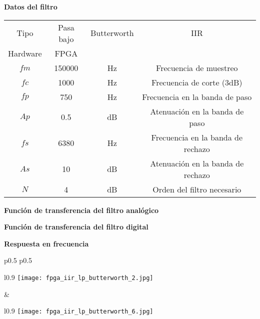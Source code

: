 \documentclass[informe.tex]{subfiles}
\begin{document}
\textbf{Datos del filtro}	\newline	
								
	\begin{tabular}{ |c | c| c| c|}
		\hline
 			 Tipo     & Pasa bajo & Butterworth &  IIR \\
 			 Hardware & FPGA &  & \\
			$ fm $  & 150000  & Hz & Frecuencia de muestreo \\
			$ fc $  & 1000  & Hz & Frecuencia de corte (3dB) \\
			$ fp $  & 750  & Hz & Frecuencia en la banda de paso\\
			$ Ap $  & 0.5  & dB & Atenuación en la banda de paso \\			
			$ fs $  & 6380  & Hz & Frecuencia en la banda de rechazo \\
			$ As $  & 10  & dB & Atenuación en la banda de rechazo \\
			$ N $  & 4  & dB & Orden del filtro necesario \\			
		\hline
	\end{tabular}\newline\newline		
	
\textbf{Función de transferencia del filtro analógico}\newline
	\begin{tiny}
		
	\end{tiny}\newline
    	
\textbf{Función de transferencia del filtro digital}\newline
	\begin{tiny}
		
	\end{tiny}\newline
	
\textbf{Respuesta en frecuencia}\newline
	\begin{tabular}{p{0.5\textwidth} p{0.5\textwidth}}		
		\begin{wrapfigure}{l}{0.9\linewidth}
    		\centering
    		\texttt{[image: fpga\_iir\_lp\_butterworth\_2.jpg]}
    		\caption{Filtro analógico}
		\end{wrapfigure}					
		&	
	 	\begin{wrapfigure}{l}{0.9\linewidth}
    		\centering
    		\texttt{[image: fpga\_iir\_lp\_butterworth\_6.jpg]}
    		\caption{Filtro digital}
		\end{wrapfigure}			
	 	\\ 
	\end{tabular}\newpage
	
\end{document}
